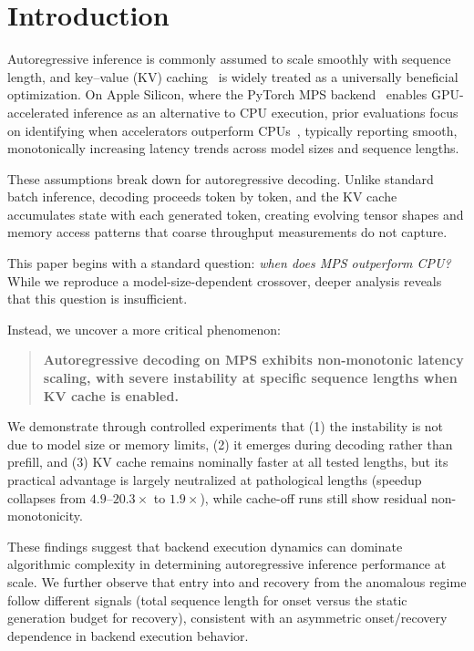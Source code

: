 \documentclass{article}
\begin{document}

\section{Introduction}

Autoregressive inference is commonly assumed to scale smoothly with sequence length, and key--value (KV) caching~\cite{kwon2023pagedattention} is widely treated as a universally beneficial optimization. On Apple Silicon, where the PyTorch MPS backend~\cite{pytorch2022mps} enables GPU-accelerated inference as an alternative to CPU execution, prior evaluations focus on identifying when accelerators outperform CPUs~\cite{alizadeh2024llmflash}, typically reporting smooth, monotonically increasing latency trends across model sizes and sequence lengths.

These assumptions break down for autoregressive decoding. Unlike standard batch inference, decoding proceeds token by token, and the KV cache accumulates state with each generated token, creating evolving tensor shapes and memory access patterns that coarse throughput measurements do not capture.

This paper begins with a standard question: \textit{when does MPS outperform CPU?} While we reproduce a model-size-dependent crossover, deeper analysis reveals that this question is insufficient.

Instead, we uncover a more critical phenomenon:

\begin{quote}
\textbf{Autoregressive decoding on MPS exhibits non-monotonic latency scaling, with severe instability at specific sequence lengths when KV cache is enabled.}
\end{quote}

We demonstrate through controlled experiments that (1) the instability is not due to model size or memory limits, (2) it emerges during decoding rather than prefill, and (3) KV cache remains nominally faster at all tested lengths, but its practical advantage is largely neutralized at pathological lengths (speedup collapses from $4.9$--$20.3\times$ to $1.9\times$), while cache-off runs still show residual non-monotonicity.

These findings suggest that backend execution dynamics can dominate algorithmic complexity in determining autoregressive inference performance at scale. We further observe that entry into and recovery from the anomalous regime follow different signals (total sequence length for onset versus the static generation budget for recovery), consistent with an asymmetric onset/recovery dependence in backend execution behavior.
\end{document}
